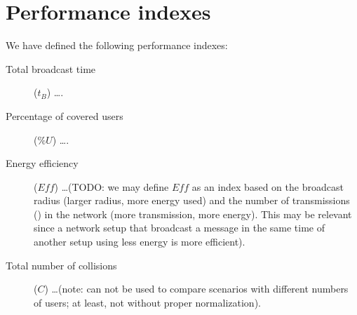 \section{Performance indexes}\label{sec:indexes}

We have defined the following performance indexes:
\begin{description}
	\item[Total broadcast time] (\(t_B\)) \ldots.
	\item[Percentage of covered users] (\(\mathit{\%U}\)) \ldots.
	\item[Energy efficiency] (\(\mathit{Eff}\)) \ldots (TODO\@: we may
		define \(\mathit{Eff}\) as an index based on the broadcast
		radius (larger radius, more energy used) and the number of
		transmissions () in the network (more
		transmission, more energy). This may be relevant since a network
		setup that broadcast a message in the same time of another setup
		using less energy is more efficient).
	\item[Total number of collisions] (\(C\)) \ldots (note: can not be used
		to compare scenarios with different numbers of users; at least,
		not without proper normalization).
\end{description}
